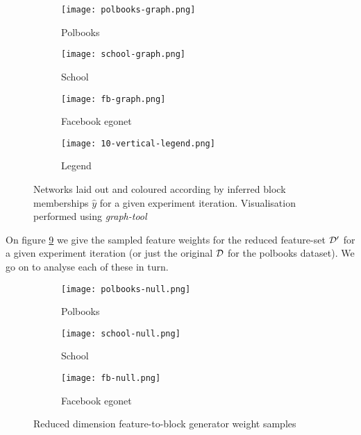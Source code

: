 \begin{figure}[!h]
	\centering
	\begin{subfigure}[t]{0.28\linewidth}
		\centering
		\texttt{[image: polbooks-graph.png]}
		\caption{Polbooks}
		\label{fig:polbooks-graph}
	\end{subfigure}
	\hfill
	\begin{subfigure}[t]{0.28\linewidth}
		\centering
		\texttt{[image: school-graph.png]}
		\caption{School}
		\label{fig:school-graph}
	\end{subfigure}
	\hfill
	\begin{subfigure}[t]{0.28\linewidth}
		\centering
		\texttt{[image: fb-graph.png]}
		\caption{Facebook egonet}
		\label{fig:fb-graph}
	\end{subfigure}
	\begin{subfigure}[t]{0.10\linewidth}
		\centering
		\texttt{[image: 10-vertical-legend.png]}
		\caption{Legend}
		\label{fig:10-legend}
	\end{subfigure}
	\caption{Networks laid out and coloured according by inferred block memberships $\hat{y}$ for a given experiment iteration. Visualisation performed using \textit{graph-tool} \cite{peixoto_graph-tool_2014}}
	\label{fig:graphs-all}
\end{figure}

On figure \ref{fig:null-all} we give the sampled feature weights for the reduced feature-set $\mathcal{D}'$ for a given experiment iteration (or just the original $\mathcal{D}$ for the polbooks dataset). We go on to analyse each of these in turn.

\begin{figure}[!h]
	\centering
	\begin{subfigure}[t]{0.32\linewidth}
		\centering
		\vskip 0pt
		\texttt{[image: polbooks-null.png]}
		\caption{Polbooks}
		\label{fig:polbooks-null}
	\end{subfigure}
	\hfill
	\begin{subfigure}[t]{0.32\linewidth}
		\centering
		\vskip 0pt
		\texttt{[image: school-null.png]}
		\caption{School}
		\label{fig:school-null}
	\end{subfigure}
	\hfill
	\begin{subfigure}[t]{0.32\linewidth}
		\centering
		\vskip 0pt
		\texttt{[image: fb-null.png]}
		\caption{Facebook egonet}
		\label{fig:fb-null}
	\end{subfigure}
	\caption{Reduced dimension feature-to-block generator weight samples}
	\label{fig:null-all}
\end{figure}

